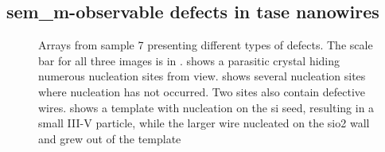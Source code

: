 \subsection{\texorpdfstring{\acs{sem_m}-observable defects in \acs{tase} nanowires}{SEM observable defects in TASE nanowires}}

\begin{figure}
    \centering
    \caption[Arrays from sample 7 presenting different types of defects.]{Arrays from sample 7 presenting different types of defects. The scale bar for all three images is in .  shows a parasitic crystal hiding numerous nucleation sites from view.  shows several nucleation sites where nucleation has not occurred. Two sites also contain defective wires.  shows a template with nucleation on the \acs{si} seed, resulting in a small III-V particle, while the larger wire nucleated on the \acs{sio2} wall and grew out of the template \cite{Brugnolotto2023_2}}
    \label{fig:defects}
\end{figure}

